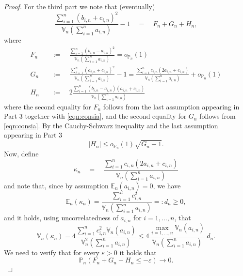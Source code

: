\documentclass[preprint]{imsart}
\newcommand{\eps}{\varepsilon}
\numberwithin{equation}{section}
\begin{document}
\begin{proof}
For the third part we note that (eventually)
%
\begin{equation}
\frac{\sum_{i = 1}^n (b_{i,n} + c_{i,n})^2}{\mathbb{V}_n(\sum_{i = 1}^n a_{i,n})} - 1 \quad = \quad F_n + G_n + H_n,
\end{equation}
%
where
%
\begin{align}\label{eqn:Fn}
F_n \quad &:= \quad \frac{\sum_{i = 1}^n (b_{i,n} - a_{i,n})^2}{\mathbb{V}_n(\sum_{i = 1}^n a_{i,n})} = o_{\mathbb{P}_n}(1) \\[7pt]
\label{eqn:Gn}
G_n \quad &:= \quad \frac{\sum_{i = 1}^n (a_{i,n} + c_{i,n})^2}{ \mathbb{V}_n(\sum_{i = 1}^n a_{i,n})} - 1 = \frac{\sum_{i = 1}^n c_{i,n}(2a_{i,n} + c_{i,n})}{ \mathbb{V}_n(\sum_{i = 1}^n a_{i,n})}+ o_{\mathbb{P}_n}(1)  \\[7pt]
\label{eqn:Hn}
H_n \quad &:= \quad 2 \frac{\sum_{i = 1}^n(b_{i,n} - a_{i,n})(a_{i,n} + c_{i,n})}{ \mathbb{V}_n(\sum_{i = 1}^n a_{i,n})} 
\end{align}
%
where the second equality for $F_n$ follows from the last assumption appearing in Part 3 together with \eqref{eqn:consia}, and the second equality for $G_n$ follows from \eqref{eqn:consia}. By the Cauchy-Schwarz inequality and the last assumption appearing in Part 3
%
\begin{equation}\label{eqn:Hnbound}
|H_n| \leq o_{\mathbb{P}_n}(1) \sqrt{G_n + 1}.
\end{equation}
%
Now, define
%
\begin{equation}
\kappa_n \quad = \quad \frac{\sum_{i = 1}^n c_{i,n}(2a_{i,n} + c_{i,n})}{ \mathbb{V}_n(\sum_{i = 1}^n a_{i,n})}
\end{equation}
%
and note that, since by assumption $\mathbb{E}_n(a_{i,n}) = 0$, we have
%
\begin{equation}
\mathbb{E}_n(\kappa_n) = \frac{\sum_{i = 1}^n c_{i,n}^2}{\mathbb{V}_n(\sum_{i = 1}^n a_{i,n})} =: d_n \geq 0,
\end{equation}
%
and it holds, using uncorrelatedness of $a_{i,n}$ for $i = 1, \hdots, n$, that
%
\begin{equation}\label{eqn:kappavb}
\mathbb{V}_n(\kappa_n) = 4 \frac{\sum_{i = 1}^n c_{i,n}^2 \mathbb{V}_n(a_{i,n})}{\mathbb{V}^2_n(\sum_{i = 1}^n a_{i,n})}  \leq 4 \frac{\max_{i = 1, \hdots, n} \mathbb{V}_n(a_{i,n})}{\mathbb{V}_n(\sum_{i = 1}^n a_{i,n})} ~ d_n.
\end{equation}
%
We need to verify that for every $\eps > 0$ it holds that
%
\begin{equation}
\mathbb{P}_n \left( F_n + G_n + H_n \leq - \eps \right) \to 0.

\end{equation}
\end{proof}
\end{document}
